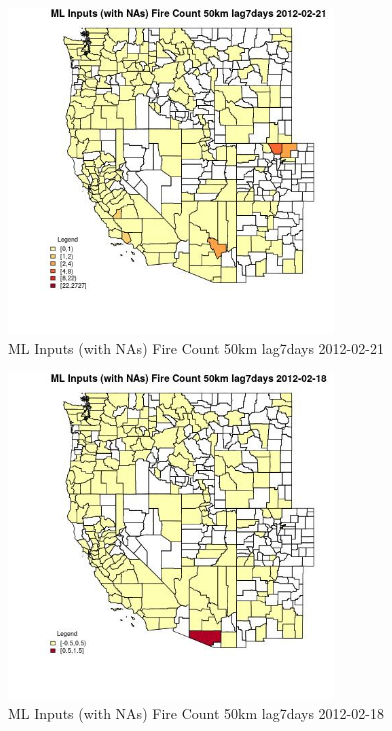 \begin{figure} 
\centering  
\includegraphics[width=0.77\textwidth]{Code_Outputs/Report_ML_input_PM25_Step4_part_f_de_duplicated_aves_prioritize_24hr_obswNAs_CountyFire_Count_50km_lag7daysMean2012-02-21.jpg} 
\caption{\label{fig:Report_ML_input_PM25_Step4_part_f_de_duplicated_aves_prioritize_24hr_obswNAsCountyFire_Count_50km_lag7daysMean2012-02-21}ML Inputs (with NAs) Fire Count 50km lag7days 2012-02-21} 
\end{figure} 
 

\begin{figure} 
\centering  
\includegraphics[width=0.77\textwidth]{Code_Outputs/Report_ML_input_PM25_Step4_part_f_de_duplicated_aves_prioritize_24hr_obswNAs_CountyFire_Count_50km_lag7daysMean2012-02-18.jpg} 
\caption{\label{fig:Report_ML_input_PM25_Step4_part_f_de_duplicated_aves_prioritize_24hr_obswNAsCountyFire_Count_50km_lag7daysMean2012-02-18}ML Inputs (with NAs) Fire Count 50km lag7days 2012-02-18} 
\end{figure} 
 


